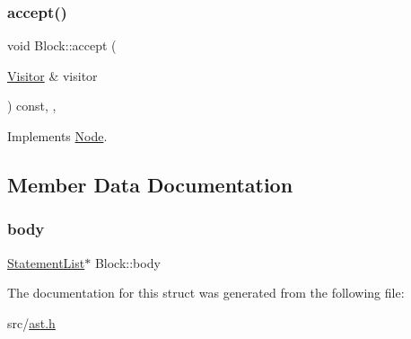 \subsubsection{\texorpdfstring{accept()}{accept()}}
{\footnotesize\ttfamily void Block\+::accept (\begin{DoxyParamCaption}\item[{\hyperlink{struct_visitor}{Visitor} \&}]{visitor }\end{DoxyParamCaption}) const\hspace{0.3cm}{\ttfamily [inline]}, {\ttfamily [override]}, {\ttfamily [virtual]}}



Implements \hyperlink{struct_node_a10bd7af968140bbf5fa461298a969c71}{Node}.



\subsection{Member Data Documentation}
\mbox{\label{struct_block_a05207097167e9263252079d78f3d9358}} 
\subsubsection{\texorpdfstring{body}{body}}
{\footnotesize\ttfamily \hyperlink{struct_statement_list}{Statement\+List}$\ast$ Block\+::body}



The documentation for this struct was generated from the following file\+:\begin{DoxyCompactItemize}
\item 
src/\hyperlink{ast_8h}{ast.\+h}\end{DoxyCompactItemize}

